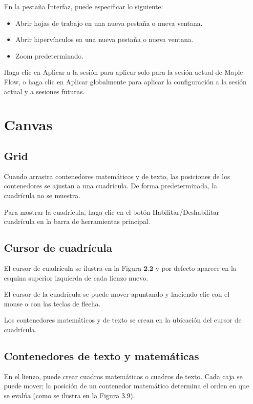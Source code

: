 En la pestaña Interfaz, puede especificar lo siguiente:

\begin{itemize}
  \item Abrir hojas de trabajo en una nueva pestaña o nueva ventana.

\item Abrir hipervínculos en una nueva pestaña o nueva ventana.

\item Zoom predeterminado.
\end{itemize}

Haga clic en Aplicar a la sesión para aplicar solo para la sesión actual de Maple Flow, o haga clic en Aplicar globalmente para aplicar la configuración a la sesión actual y a sesiones futuras.


\section{Canvas}
\subsection{Grid}
Cuando arrastra contenedores matemáticos y de texto, las posiciones de los contenedores se ajustan a una cuadrícula. De forma predeterminada, la cuadrícula no se muestra.

Para mostrar la cuadrícula, haga clic en el botón Habilitar/Deshabilitar cuadrícula en la barra de herramientas principal.


\subsection{Cursor de cuadrícula}
El cursor de cuadrícula se ilustra en la Figura $\mathbf{2. 2}$ y por defecto aparece en la esquina superior izquierda de cada lienzo nuevo.

El cursor de la cuadrícula se puede mover apuntando y haciendo clic con el mouse o con las teclas de flecha.

Los contenedores matemáticos y de texto se crean en la ubicación del cursor de cuadrícula.

\subsection{Contenedores de texto y matemáticas}
En el lienzo, puede crear cuadros matemáticos o cuadros de texto. Cada caja se puede mover; la posición de un contenedor matemático determina el orden en que se evalúa (como se ilustra en la Figura 3.9).


